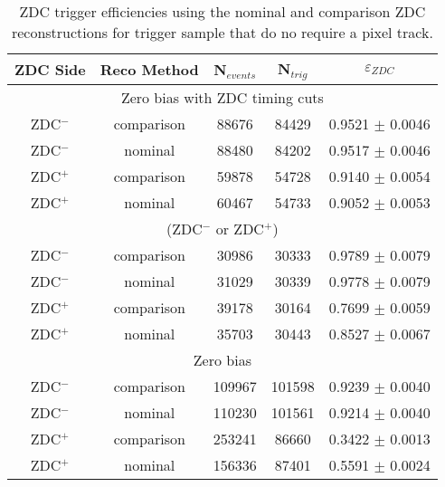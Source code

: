       \begin{table}
        \centering
        \begin{tabular}{|c|c|c|c|c|}
          \hline ZDC Side & Reco Method & N$_{events}$ & N$_{trig}$ & $\varepsilon_{ZDC}$ \\ \hline
          \multicolumn{5}{|c|}{ Zero bias with ZDC timing cuts} \\ \hline 
           ZDC$^{-}$ & comparison & 88676  & 84429  & 0.9521 $\pm$ 0.0046 \\ \hline
           ZDC$^{-}$ & nominal & 88480  & 84202  & 0.9517 $\pm$ 0.0046 \\ \hline
           ZDC$^{+}$ & comparison & 59878  & 54728  & 0.9140  $\pm$ 0.0054 \\ \hline
           ZDC$^{+}$ & nominal & 60467  & 54733  & 0.9052  $\pm$ 0.0053 \\ \hline
           \multicolumn{5}{|c|}{(ZDC$^{-}$ or ZDC$^{+}$)} \\ \hline 
           ZDC$^{-}$ & comparison & 30986 & 30333 & 0.9789 $\pm$ 0.0079 \\ \hline
           ZDC$^{-}$ & nominal & 31029 & 30339 & 0.9778 $\pm$ 0.0079 \\ \hline
           ZDC$^{+}$ & comparison & 39178 & 30164 & 0.7699 $\pm$ 0.0059 \\ \hline
           ZDC$^{+}$ & nominal & 35703 & 30443 & 0.8527 $\pm$ 0.0067 \\ \hline
           \multicolumn{5}{|c|}{ Zero bias} \\ \hline 
           ZDC$^{-}$ & comparison & 109967  & 101598  & 0.9239 $\pm$ 0.0040 \\ \hline
           ZDC$^{-}$ & nominal & 110230  & 101561  & 0.9214 $\pm$ 0.0040 \\ \hline
           ZDC$^{+}$ & comparison & 253241  & 86660  & 0.3422 $\pm$ 0.0013 \\ \hline
           ZDC$^{+}$ & nominal & 156336  & 87401  & 0.5591 $\pm$ 0.0024 \\ \hline
         \end{tabular}
        \caption{ZDC trigger efficiencies using  the nominal and comparison 
        ZDC reconstructions for trigger sample that do no require a pixel track.}
        \label{tab:zdcEfficiencySysNoiseSample}
      \end{table}
